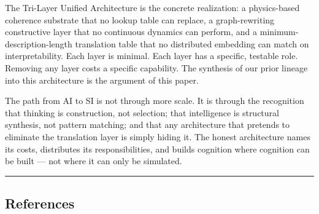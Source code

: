 \documentclass[
  11pt,
  a4paper,
]{article}
\begin{document}
The Tri-Layer Unified Architecture is the concrete realization: a
physics-based coherence substrate that no lookup table can replace, a
graph-rewriting constructive layer that no continuous dynamics can
perform, and a minimum-description-length translation table that no
distributed embedding can match on interpretability. Each layer is
minimal. Each layer has a specific, testable role. Removing any layer
costs a specific capability. The synthesis of our prior lineage into
this architecture is the argument of this paper.

The path from AI to SI is not through more scale. It is through the
recognition that thinking is construction, not selection; that
intelligence is structural synthesis, not pattern matching; and that any
architecture that pretends to eliminate the translation layer is simply
hiding it. The honest architecture names its costs, distributes its
responsibilities, and builds cognition where cognition can be built ---
not where it can only be simulated.

\begin{center}\rule{0.5\linewidth}{0.5pt}\end{center}

\subsection{References}\label{references}
\end{document}
